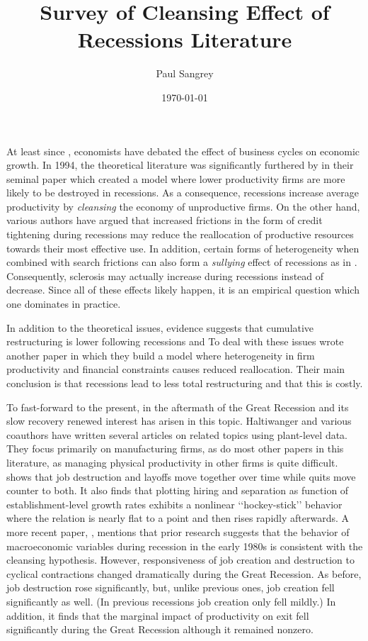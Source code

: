 \documentclass[11pt]{amsart}
\date{\today}
\title{Survey of Cleansing Effect of Recessions Literature}
\author{Paul Sangrey}
\newcommand{\qt}[1]{\lq\lq#1\rq\rq}
\begin{document}
\maketitle 

At least since \cite{schumpeter1939business}, economists have debated the effect of business cycles on economic growth. 
In 1994, the theoretical literature was significantly furthered by \citeauthor{caballero1994cleansing} in their seminal paper  which created a model where lower productivity firms are more likely to be destroyed in recessions. 
As a consequence, recessions increase average productivity by \textit{cleansing} the economy of unproductive firms. 
On the other hand, various authors have argued that increased frictions in the form of credit tightening during recessions may reduce the reallocation of productive resources towards their most effective use. 
In addition, certain forms of heterogeneity when combined with search frictions can also form a \textit{sullying} effect of recessions as in \cite{barlevy2002sullying}. 
Consequently, sclerosis may actually increase during recessions instead of decrease.
Since all of these effects likely happen, it is an empirical question which one dominates in practice.


In addition to the theoretical issues, evidence suggests that cumulative restructuring is lower following recessions and 
To deal with these issues \citeauthor{caballero2005cost} wrote another paper  in which they build a model where heterogeneity in firm productivity and financial constraints causes reduced reallocation. 
Their main conclusion is that recessions lead to less total restructuring and that this is costly. 

To fast-forward to the present, in the aftermath of the Great Recession and its slow recovery renewed interest has arisen in this topic.
Haltiwanger and various coauthors have written several articles on related topics using plant-level data.
They focus primarily on manufacturing firms, as do most other papers in this literature, as managing physical productivity in other firms is quite difficult.  
\cite{davis2012labor} shows that job destruction and layoffs move together over time while quits move counter to both. 
It also finds that plotting hiring and separation as function of establishment-level growth rates exhibits a nonlinear \qt{hockey-stick} behavior where the relation is nearly flat to a point and then rises rapidly afterwards. 
A more recent paper, \cite{foster2016reallocation}, mentions that prior research suggests that the behavior of macroeconomic variables during recession in the early 1980s is consistent with the cleansing hypothesis. 
However, responsiveness of job creation and destruction to cyclical contractions changed dramatically during the Great Recession. 
As before, job destruction rose significantly, but, unlike previous ones, job creation fell significantly as well.
(In previous recessions job creation only fell mildly.)
In addition, it finds that the marginal impact of productivity on exit fell significantly during the Great Recession although it remained nonzero. 
\end{document}
